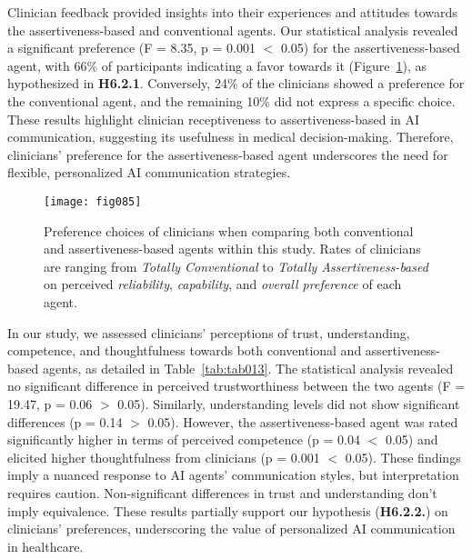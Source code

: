 \textcolor{revised}{Clinician feedback provided insights into their experiences and attitudes towards the assertiveness-based and conventional agents.
Our statistical analysis revealed a significant preference (F = 8.35, p = 0.001 $<$ 0.05) for the assertiveness-based agent, with 66\% of participants indicating a favor towards it (Figure~\ref{fig:fig085}), as hypothesized in {\bf H6.2.1}.
Conversely, 24\% of the clinicians showed a preference for the conventional agent, and the remaining 10\% did not express a specific choice.
These results highlight clinician receptiveness to assertiveness-based in \ac{AI} communication, suggesting its usefulness in medical decision-making.
Therefore, clinicians' preference for the assertiveness-based agent underscores the need for flexible, personalized \ac{AI} communication strategies.}

\begin{figure}[htpb]
\centering
\texttt{[image: fig085]}
\caption[]{Preference choices of clinicians when comparing both conventional and assertiveness-based agents within this study. Rates of clinicians are ranging from {\it Totally Conventional} to {\it Totally Assertiveness-based} on perceived {\it reliability}, {\it capability}, and {\it overall preference} of each agent.}
\label{fig:fig085}
\end{figure}

\textcolor{revised}{In our study, we assessed clinicians' perceptions of trust, understanding, competence, and thoughtfulness towards both conventional and assertiveness-based agents, as detailed in Table~\ref{tab:tab013}.
The statistical analysis revealed no significant difference in perceived trustworthiness between the two agents (F = 19.47, p = 0.06 $>$ 0.05).
Similarly, understanding levels did not show significant differences (p = 0.14 $>$ 0.05).
However, the assertiveness-based agent was rated significantly higher in terms of perceived competence (p = 0.04 $<$ 0.05) and elicited higher thoughtfulness from clinicians (p = 0.001 $<$ 0.05).
These findings imply a nuanced response to \ac{AI} agents' communication styles, but interpretation requires caution.
Non-significant differences in trust and understanding don't imply equivalence.
These results partially support our hypothesis ({\bf H6.2.2.}) on clinicians' preferences, underscoring the value of personalized \ac{AI} communication in healthcare.}



